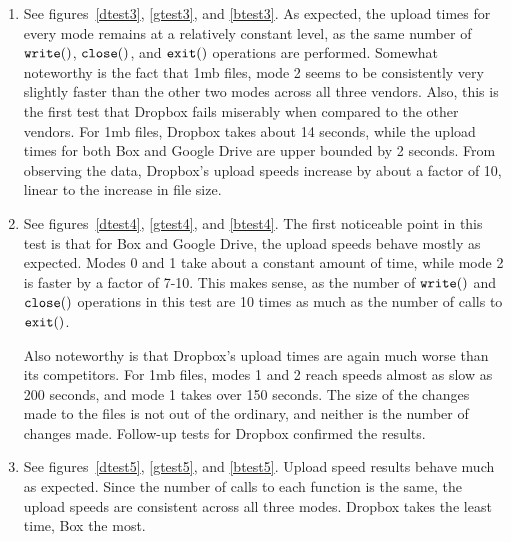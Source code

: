 \documentclass[pageno]{jpaper}
\begin{document}
\begin{enumerate}[label=Test \arabic*:,start=0]
\item See figures~\ref{dtest3}, \ref{gtest3}, and \ref{btest3}. As expected, the upload times for every mode remains at a relatively constant level, as the same number of $\tt{write()}$, $\tt{close()}$, and $\tt{exit()}$ operations are performed. Somewhat noteworthy is the fact that 1mb files, mode 2 seems to be consistently very slightly faster than the other two modes across all three vendors. Also, this is the first test that Dropbox fails miserably when compared to the other vendors. For 1mb files, Dropbox takes about 14 seconds, while the upload times for both Box and Google Drive are upper bounded by 2 seconds. From observing the data, Dropbox's upload speeds increase by about a factor of 10, linear to the increase in file size.

\begin{center}
\CT
{}\quad
{}\quad
{}
\end{center}

\item See figures~\ref{dtest4}, \ref{gtest4}, and \ref{btest4}. The first noticeable point in this test is that for Box and Google Drive, the upload speeds behave mostly as expected. Modes 0 and 1 take about a constant amount of time, while mode 2 is faster by a factor of 7-10. This makes sense, as the number of $\tt{write()}$ and $\tt{close()}$ operations in this test are 10 times as much as the number of calls to $\tt{exit()}$.

Also noteworthy is that Dropbox's upload times are again much worse than its competitors. For 1mb files, modes 1 and 2 reach speeds almost as slow as 200 seconds, and mode 1 takes over 150 seconds. The size of the changes made to the files is not out of the ordinary, and neither is the number of changes made. Follow-up tests for Dropbox confirmed the results.

\begin{center}
\CT
{}\quad
{}\quad
{}
\end{center}

\item See figures~\ref{dtest5}, \ref{gtest5}, and \ref{btest5}. Upload speed results behave much as expected. Since the number of calls to each function is the same, the upload speeds are consistent across all three modes. Dropbox takes the least time, Box the most.


\end{enumerate}
\end{document}
